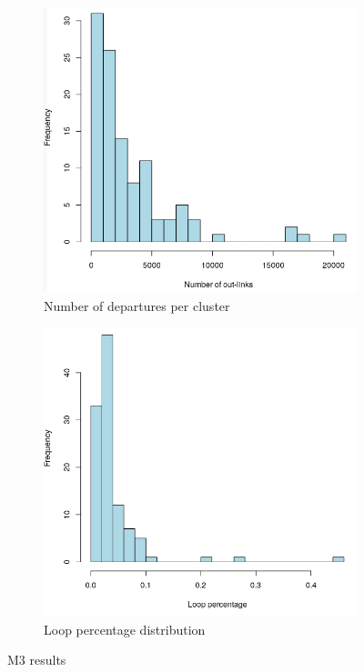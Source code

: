 \documentclass[11pt,twoside]{report}
\begin{document}
\begin{figure}[H]
	\begin{subfigure}[H]{0.54\linewidth}
		\centering
		\includegraphics[width=58 mm]{pictures/M3_links.png}
		\caption{Number of departures per cluster}
		\label{fig:M3a}
	\end{subfigure}
	\hfill
		\begin{subfigure}[H]{0.50\linewidth}
		\centering
		\includegraphics[width=58 mm]{pictures/M3_loop.png}
		\caption{Loop percentage distribution}
		\label{fig:M3b}
	\end{subfigure}%
	\caption{M3 results}
\end{figure}
\end{document}
